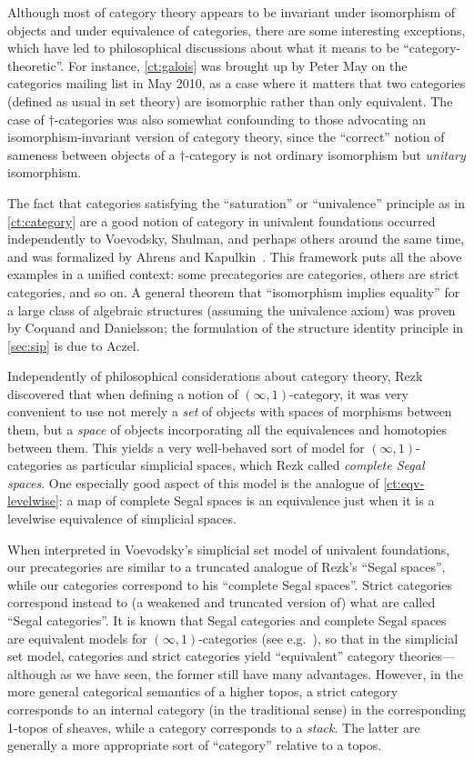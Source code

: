 Although most of category theory appears to be invariant under isomorphism of objects and under equivalence of categories, there are some interesting exceptions, which have led to philosophical discussions about what it means to be ``category-theoretic''.
For instance, \autoref{ct:galois} was brought up by Peter May on the categories mailing list in May 2010, as a case where it matters that two categories (defined as usual in set theory) are isomorphic rather than only equivalent.
The case of $\dagger$-categories was also somewhat confounding to those advocating an isomorphism-invariant version of category theory, since the ``correct'' notion of sameness between objects of a $\dagger$-category is not ordinary isomorphism but \emph{unitary} isomorphism.

The fact that categories satisfying the ``saturation'' or ``univalence'' principle as in \autoref{ct:category} are a good notion of category in univalent foundations occurred independently to Voevodsky, Shulman, and perhaps others around the same time, and was formalized by Ahrens and Kapulkin~\cite{aks:rezk}.
This framework puts all the above examples in a unified context: some precategories are categories, others are strict categories, and so on.
A general theorem that ``isomorphism implies equality'' for a large class of algebraic structures (assuming the univalence axiom) was proven by Coquand and Danielsson; the formulation of the structure identity principle in \autoref{sec:sip} is due to Aczel.

Independently of philosophical considerations about category theory, Rezk~\cite{rezk01css} discovered that when defining a notion of $(\infty,1)$-category, it was very convenient to use not merely a \emph{set} of objects with spaces of morphisms between them, but a \emph{space} of objects incorporating all the equivalences and homotopies between them.
This yields a very well-behaved sort of model for $(\infty,1)$-categories as particular simplicial spaces, which Rezk called \emph{complete Segal spaces}.
One especially good aspect of this model is the analogue of \autoref{ct:eqv-levelwise}: a map of complete Segal spaces is an equivalence just when it is a levelwise equivalence of simplicial spaces.

When interpreted in Voevodsky's simplicial set model of univalent foundations, our precategories are similar to a truncated analogue of Rezk's ``Segal spaces'', while our categories correspond to his ``complete Segal spaces''.
Strict categories correspond instead to (a weakened and truncated version of) what are called ``Segal categories''.
It is known that Segal categories and complete Segal spaces are equivalent models for $(\infty,1)$-categories (see e.g.~\cite{bergner:infty-one}), so that in the simplicial set model, categories and strict categories yield ``equivalent'' category theories---although as we have seen, the former still have many advantages.
However, in the more general categorical semantics of a higher topos, a strict category corresponds to an internal category (in the traditional sense) in the corresponding 1-topos of sheaves, while a category corresponds to a \emph{stack}.
The latter are generally a more appropriate sort of ``category'' relative to a topos.

